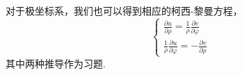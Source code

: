 对于极坐标系，我们也可以得到相应的柯西-黎曼方程，
\begin{equation}
    \left\{\begin{array}{l}
    \frac{\partial u}{\partial \rho}=\frac{1}{\rho} \frac{\partial v}{\partial \varphi} \\
    \frac{1}{\rho} \frac{\partial u}{\partial \varphi}=-\frac{\partial v}{\partial \rho}
    \end{array}\right.
    \end{equation}
其中两种推导作为习题.